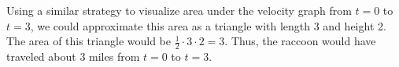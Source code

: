 \documentclass{article}
\begin{document}
\begin{enumerate}
\begin{enumerate}
\begin{solution}
    Using a similar strategy to visualize area under the velocity graph from $t=0$ to $t=3$, we could approximate this area as a triangle with length 3 and height 2. The area of this triangle would be $\frac{1}{2}\cdot3\cdot2=3$. Thus, the raccoon would have traveled about 3 miles from $t=0$ to $t=3$.
\end{solution}
\vfill \vfill
\end{enumerate}
\end{enumerate}
\end{document}
